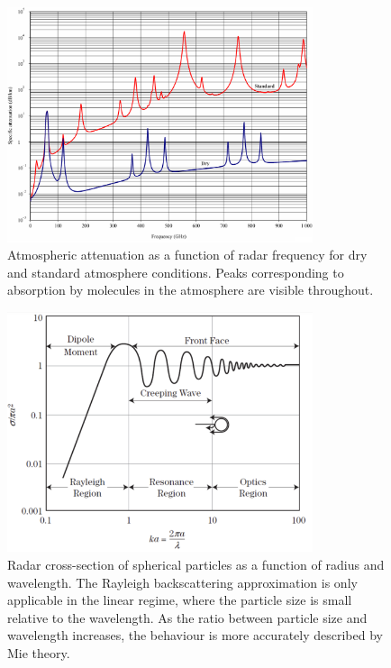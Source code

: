 \documentclass{article}
\begin{document}
\begin{figure}
	\centering
	\includegraphics[width=0.8\textwidth]{attenuation}
	\caption{Atmospheric attenuation as a function of radar frequency for dry and standard atmosphere conditions.\supercite{ITURAttenuation} Peaks corresponding to absorption by molecules in the atmosphere are visible throughout.}
	\label{fig:Attenuation}
\end{figure}
\begin{figure}
	\centering
	\includegraphics[width=0.8\textwidth]{rayleigh}
	\caption{Radar cross-section of spherical particles as a function of radius and wavelength. The Rayleigh backscattering approximation is only applicable in the linear regime, where the particle size is small relative to the wavelength. As the ratio between particle size and wavelength increases, the behaviour is more accurately described by Mie theory.\supercite{POMRRayleighScattering}}
	\label{fig:RayleighCurve}
\end{figure}
\end{document}
